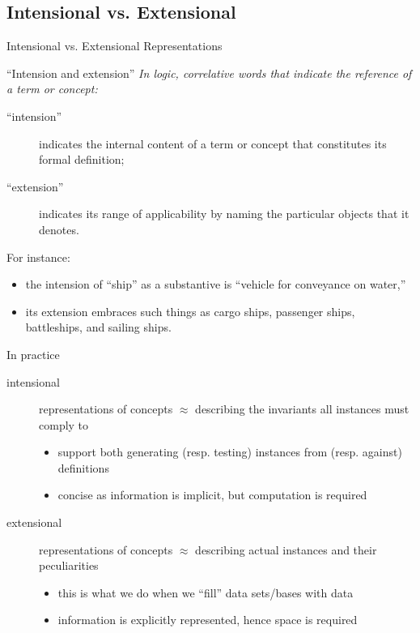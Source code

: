 \documentclass[presentation]{beamer}\mode<presentation>{\usetheme{AMSBolognaFC}}
\begin{document}
\subsection{Intensional vs. Extensional}

\begin{frame}[allowframebreaks]{Intensional vs. Extensional Representations}
    \begin{block}{``Intension and extension'' }\itshape\small
        In logic, correlative words that indicate the reference of a term or concept:
        \begin{description}
            \item[``intension''] indicates the internal content of a term or concept that constitutes its formal definition;
            \item[``extension''] indicates its range of applicability by naming the particular objects that it denotes.
        \end{description}
        For instance:
        \begin{itemize}
            \item the intension of ``ship'' as a substantive is ``vehicle for conveyance on water,''
            \item its extension embraces such things as cargo ships, passenger ships, battleships, and sailing ships.
        \end{itemize}
    \end{block}

    \framebreak

    \begin{block}{In practice}\small
        \begin{description}
            \item[intensional] representations of concepts $\approx$ describing the \alert{invariants} all instances must comply to
            \begin{itemize}
                \item support both \alert{generating} (resp. \alert{testing}) instances from (resp. against) definitions
                \item \alert{concise} as information is \alert{implicit}, but \alert{computation} is required
            \end{itemize}

            \item[extensional] representations of concepts $\approx$ describing \alert{actual} instances and their peculiarities
            \begin{itemize}
                \item this is what we do when we ``fill'' data sets/bases with data
                \item information is \alert{explicitly} represented, hence \alert{space} is required
            \end{itemize}
        \end{description}
    \end{block}


\end{frame}
\end{document}
